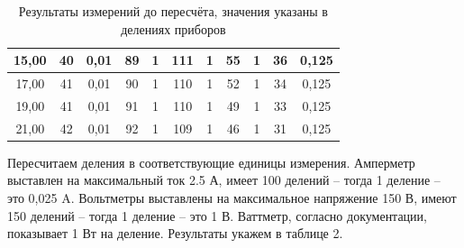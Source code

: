 \documentclass[a4paper, fontsize = 14pt]{article}
\begin{document}
\begin{table}[hbt]
{\begin{tabular}{|c|c|c|c|c|c|c|c|c|c|c|}
15,00            & 40                & 0,01                     & 89                  & 1                            & 111                     & 1                                & 55                    & 1                            & 36                  & 0,125                        \\ \hline
17,00            & 41                & 0,01                     & 90                  & 1                            & 110                     & 1                                & 52                    & 1                            & 34                  & 0,125                        \\ \hline
19,00            & 41                & 0,01                     & 91                  & 1                            & 110                     & 1                                & 49                    & 1                            & 33                  & 0,125                        \\ \hline
21,00            & 42                & 0,01                     & 92                  & 1                            & 109                     & 1                                & 46                    & 1                            & 31                  & 0,125                        \\ \hline
\end{tabular}
}
\caption{Результаты измерений до пересчёта, значения указаны в делениях приборов}
\end{table}

Пересчитаем деления в соответствующие единицы измерения. Амперметр выставлен на максимальный ток 2.5 А, имеет 100 делений -- тогда 1 деление -- это 0,025 A. Вольтметры выставлены на максимальное напряжение 150 В, имеют 150 делений -- тогда 1 деление -- это 1 В. Ваттметр, согласно документации, показывает 1 Вт на деление. Результаты укажем в таблице 2.
\end{document}
